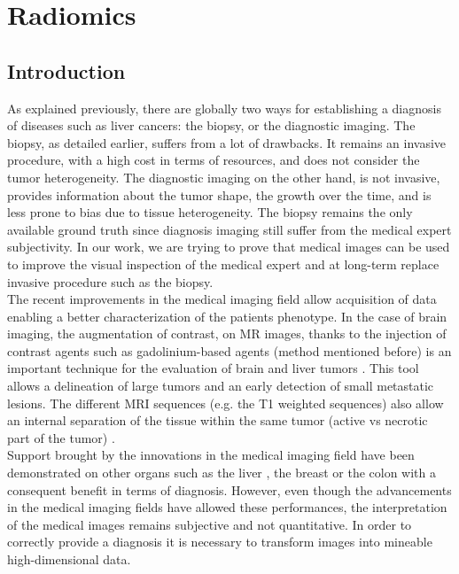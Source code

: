 
\chapter{Radiomics}\label{radiomics}

\section{Introduction}\label{introduction}

As explained previously, there are globally two ways for establishing a
diagnosis of diseases such as liver cancers: the biopsy, or the
diagnostic imaging. The biopsy, as detailed earlier, suffers from a lot of drawbacks. It
remains an invasive procedure, with a high cost in terms of resources,
and does not consider the tumor heterogeneity. The diagnostic imaging on the other hand, is not invasive, provides
information about the tumor shape, the growth over the time, and is less
prone to bias due to tissue heterogeneity.
The biopsy remains the only available ground truth since diagnosis imaging still suffer from the medical expert subjectivity. In our work, we are trying to prove that medical images can be used to improve the visual inspection of the medical expert and at long-term replace invasive procedure such as the biopsy.\\
The recent improvements in the medical imaging field allow acquisition
of data enabling a better characterization of the patients phenotype. In the case of brain imaging, the augmentation of contrast, on MR
images, thanks to the injection of contrast agents such as
gadolinium-based agents (method mentioned before) is an important
technique for the evaluation of brain and liver tumors \cite{Drevelegas2011,Zhou2014,Thian2013}. This tool allows a delineation of large tumors and an
early detection of small metastatic lesions. The different MRI sequences
(e.g. the T1 weighted sequences) also allow an internal separation of
the tissue within the same tumor (active vs necrotic part of the tumor)
\cite{Drevelegas2011}. \\
Support brought by the innovations in the medical imaging field have
been demonstrated on other organs such as the liver \cite{Davnall2012}, the breast \cite{Koolen2012} or the colon
\cite{Sahani2014} with a consequent benefit in terms of
diagnosis. However, even though the advancements in the medical imaging fields have
allowed these performances, the interpretation of the medical images
remains subjective and not quantitative. In order to correctly provide a
diagnosis it is necessary to transform images into mineable high-dimensional data.

